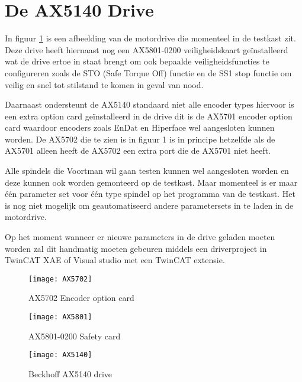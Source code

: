 \section{De AX5140 Drive}

In figuur \ref{fig:AX5140} is een afbeelding van de motordrive die momenteel in de testkast zit. Deze drive heeft hiernaast nog een \gls{AX5801}-0200 veiligheidskaart geïnstalleerd wat de drive ertoe in staat brengt om ook bepaalde veiligheidsfuncties te configureren zoals de \gls{STO} (Safe Torque Off) functie en de \gls{SS1} stop functie om veilig en snel tot stilstand te komen in geval van nood. \cite{web:AX5801}

\vspace{0.5cm}

Daarnaast ondersteunt de \gls{AX5140} standaard niet alle encoder types hiervoor is een extra option card geïnstalleerd in de drive dit is de \gls{AX5701} encoder option card waardoor encoders zoals EnDat en Hiperface wel aangesloten kunnen worden. De \gls{AX5702} die te zien is in figuur 1 is in principe hetzelfde als de \gls{AX5701} alleen heeft de \gls{AX5702} een extra port die de \gls{AX5701} niet heeft. 

\vspace{0.5cm}

Alle spindels die Voortman wil gaan testen kunnen wel aangesloten worden en deze kunnen ook worden gemonteerd op de testkast. Maar momenteel is er maar één parameter set voor één type spindel op het programma van de testkast. Het is nog niet mogelijk om geautomatiseerd andere parametersets in te laden in de motordrive.

\vspace{0.5cm}

Op het moment wanneer er nieuwe parameters in de drive geladen moeten worden zal dit handmatig moeten gebeuren middels een driverproject in TwinCAT XAE of Visual studio met een TwinCAT extensie.


\begin{figure}[h]
	\centering
	\begin{minipage}{0.32\textwidth}
		\texttt{[image: AX5702]}
		\vspace{0pt}
		\caption{AX5702 Encoder option card \cite{web:AX5701}}
		\label{fig:AX5702}
	\end{minipage}
	\hfill
	\begin{minipage}{0.32\textwidth}
		\texttt{[image: AX5801]}
		\vspace{0pt}
		\caption{AX5801-0200 Safety card \cite{web:AX5801}}
		\label{fig:AX5801}
	\end{minipage}
	\hfill
	\begin{minipage}{0.32\textwidth}
		\texttt{[image: AX5140]}
		\vspace{0pt}
		\caption{Beckhoff AX5140 drive \cite{web:AX5140Drive}}
		\label{fig:AX5140}
	\end{minipage}
\end{figure}

